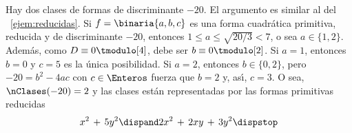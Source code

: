 \begin{ejemGeneros}\label{ejem:generos:menos-veinte}
	Hay dos clases de formas de discriminante $-20$.
	El argumento es similar al del \ejemname~\ref{ejem:reducidas}.
	Si $f=\binaria{a,b,c}$ es una forma cuadr\'atica primitiva,
	reducida y de discriminante $-20$, entonces
	$1\leq a\leq\sqrt{20/3}<7$, o sea $a\in\{1,2\}$. Adem\'as,
	como $D\equiv 0\tmodulo[4]$, debe ser $b\equiv 0\tmodulo[2]$. 
	Si $a=1$, entonces $b=0$ y $c=5$ es la \'unica posibilidad.
	Si $a=2$, entonces $b\in\{0,2\}$, pero $-20=b^2-4ac$ con
	$c\in\Enteros$ fuerza que $b=2$ y, as\'{\i}, $c=3$. O sea,
	$\nClases(-20)=2$ y las clases est\'an representadas por
	las formas primitivas reducidas
	\begin{displaymath}
		x^2\,+\,5y^2\dispand 2x^2\,+\,2xy\,+\,3y^2
		\dispstop
	\end{displaymath}


\end{ejemGeneros}
